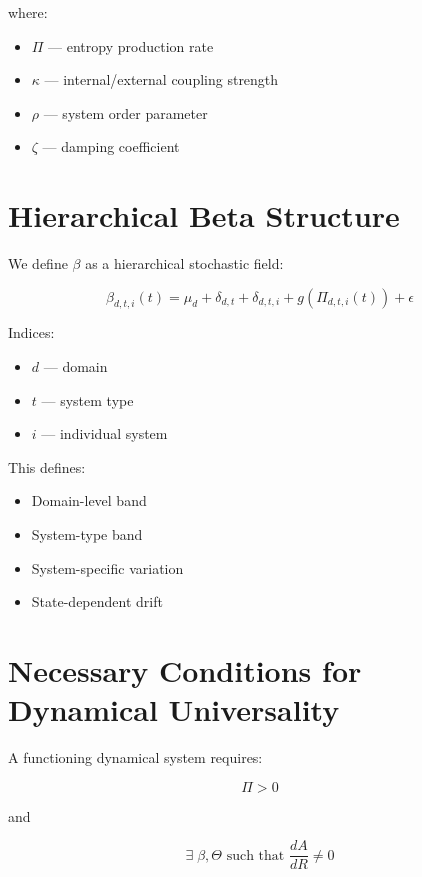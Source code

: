\documentclass[12pt]{article}
\begin{document}
where:

\begin{itemize}
\item $\Pi$ — entropy production rate
\item $\kappa$ — internal/external coupling strength
\item $\rho$ — system order parameter
\item $\zeta$ — damping coefficient
\end{itemize}

\section{Hierarchical Beta Structure}

We define $\beta$ as a hierarchical stochastic field:

\begin{equation}
\beta_{d,t,i}(t) =
\mu_d
+ \delta_{d,t}
+ \delta_{d,t,i}
+ g(\Pi_{d,t,i}(t))
+ \epsilon
\end{equation}

Indices:

\begin{itemize}
\item $d$ — domain
\item $t$ — system type
\item $i$ — individual system
\end{itemize}

This defines:

\begin{itemize}
\item Domain-level band
\item System-type band
\item System-specific variation
\item State-dependent drift
\end{itemize}

\section{Necessary Conditions for Dynamical Universality}

A functioning dynamical system requires:

\begin{equation}
\Pi > 0
\end{equation}

and

\begin{equation}
\exists \; \beta, \Theta \text{ such that } \frac{dA}{dR} \neq 0
\end{equation}
\end{document}
